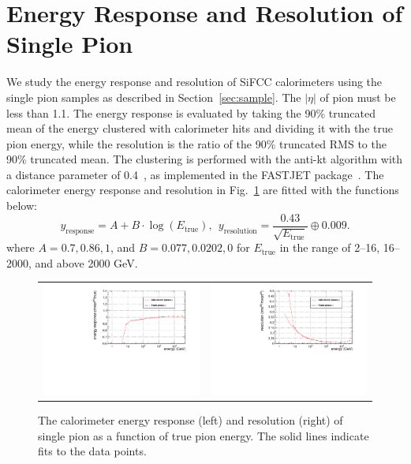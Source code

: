 \documentclass{PoS}
\begin{document}
\section{Energy Response and Resolution of Single Pion}
We study the energy response and resolution of SiFCC calorimeters using the 
single pion samples as described in Section~\ref{sec:sample}. The $\left|\eta\right|$ 
of pion must be less than 1.1. The energy 
response is evaluated by taking the 90\% truncated mean of the energy 
clustered with calorimeter hits and dividing it with the true pion energy, 
while the resolution is the ratio of the 90\% truncated RMS to 
the 90\% truncated mean. 
The clustering is performed with the anti-kt algorithm with a distance 
parameter of 0.4~\cite{Cacciari:2008gp}, as implemented in the \textsc{FASTJET}
package~\cite{fastjet}. The calorimeter energy response and resolution in 
Fig.~\ref{fig:piresponse} are fitted with the functions below:
\begin{equation}
 y_\mathrm{response} = A + B\cdot\log\left(E_\mathrm{true}\right), ~~y_\mathrm{resolution} = \frac{0.43}{\sqrt{E_\mathrm{true}}} \oplus 0.009.
\label{eq:response}
\end{equation}
where $A=0.7,0.86,1$, and $B=0.077,0.0202,0$ for $E_\mathrm{true}$ in the 
range of 2--16, 16--2000, and above 2000 GeV. 


\begin{figure}
\begin{center}
\begin{tabular}{cc}
\includegraphics[width=.5\textwidth]{figs/pi_response.pdf} & 
\includegraphics[width=.5\textwidth]{figs/pi_resolution.pdf}\\
\end{tabular}
\end{center}
\caption{The calorimeter energy response (left) and resolution (right) of single 
pion as a function of true pion energy. The solid lines indicate fits to 
the data points. %
}
\label{fig:piresponse}
\end{figure}
\end{document}
